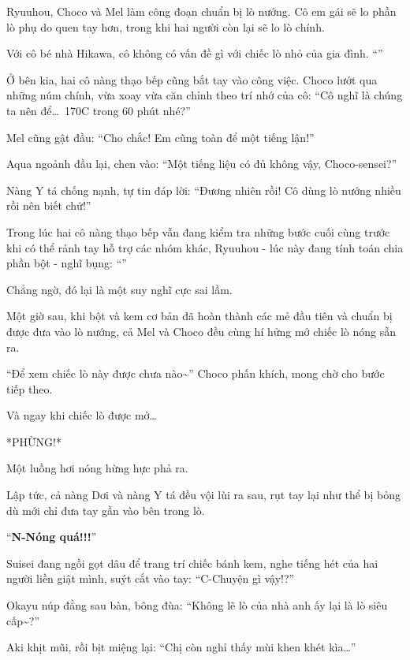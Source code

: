 \documentclass[../main.tex]{subfiles}
\begin{document}
\ct

Ryuuhou, Choco và Mel làm công đoạn chuẩn bị lò nướng. Cô em gái sẽ lo phần lò phụ do quen tay hơn, trong khi hai người còn lại sẽ lo lò chính.

Với cô bé nhà Hikawa, cô không có vấn đề gì với chiếc lò nhỏ của gia đình. ``''

Ở bên kia, hai cô nàng thạo bếp cũng bắt tay vào công việc. Choco lướt qua những núm chính, vừa xoay vừa căn chỉnh theo trí nhớ của cô: ``Cô nghĩ là chúng ta nên để\dots\ 170\degree C trong 60 phút nhé?''

Mel cũng gật đầu: ``Cho chắc! Em cũng toàn để một tiếng lận!''

Aqua ngoảnh đầu lại, chen vào: ``Một tiếng liệu có đủ không vậy, Choco-sensei?''

Nàng Y tá chống nạnh, tự tin đáp lời: ``Đương nhiên rồi! Cô dùng lò nướng nhiều rồi nên biết chứ!''

Trong lúc hai cô nàng thạo bếp vẫn đang kiểm tra những bước cuối cùng trước khi có thể rảnh tay hỗ trợ các nhóm khác, Ryuuhou - lúc này đang tính toán chia phần bột - nghĩ bụng: ``''

Chẳng ngờ, đó lại là một suy nghĩ cực sai lầm.

Một giờ sau, khi bột và kem cơ bản đã hoàn thành các mẻ đầu tiên và chuẩn bị được đưa vào lò nướng, cả Mel và Choco đều cùng hí hửng mở chiếc lò nóng sẵn ra.

``Để xem chiếc lò này được chưa nào\~{}'' Choco phấn khích, mong chờ cho bước tiếp theo.

Và ngay khi chiếc lò được mở\dots

*PHỪNG!*

Một luồng hơi nóng hừng hực phả ra.

Lập tức, cả nàng Dơi và nàng Y tá đều vội lùi ra sau, rụt tay lại như thể bị bỏng dù mới chỉ đưa tay gần vào bên trong lò.

``\textbf{N-Nóng quá!!!}''

Suisei đang ngồi gọt dâu để trang trí chiếc bánh kem, nghe tiếng hét của hai người liền giật mình, suýt cắt vào tay: ``C-Chuyện gì vậy!?''

Okayu núp đằng sau bàn, bông đùa: ``Không lẽ lò của nhà anh ấy lại là lò siêu cấp\~{}?''

Aki khịt mũi, rồi bịt miệng lại: ``Chị còn nghỉ thấy mùi khen khét kìa\dots''
\end{document}
